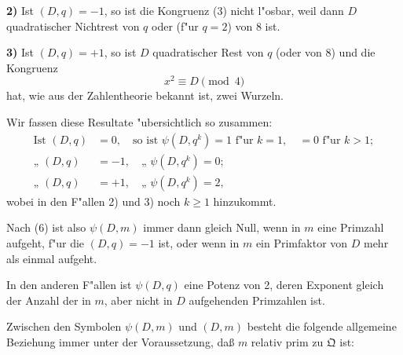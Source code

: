 \documentclass[12pt,a4paper]{article}
\theoremstyle{plain}
\begin{document}
\textbf{2)} Ist $(D, q) = -1$, so ist die Kongruenz (3) nicht l"osbar, weil dann $D$ quadratischer Nichtrest von $q$ oder (f"ur $q = 2$) von 8 ist.

\textbf{3)} Ist $(D, q) = +1$, so ist $D$ quadratischer Rest von $q$ (oder von 8) und die Kongruenz
\[
x^2 \equiv D \pmod{4}
\]
hat, wie aus der Zahlentheorie bekannt ist, zwei Wurzeln.

Wir fassen diese Resultate "ubersichtlich so zusammen:
\begin{align*}
\text{Ist } (D, q) &= 0,\quad \text{so ist } \psi(D, q^k) = 1 \text{ f"ur } k=1,\quad = 0 \text{ f"ur } k > 1;\\
\text{„ } (D, q) &= -1,\quad \text{„ } \psi(D, q^k) = 0;\\
\text{„ } (D, q) &= +1,\quad \text{„ } \psi(D, q^k) = 2,
\end{align*}
wobei in den F"allen 2) und 3) noch $k \geq 1$ hinzukommt.

Nach (6) ist also $\psi(D, m)$ immer dann gleich Null, wenn in $m$ eine Primzahl aufgeht, f"ur die $(D, q) = -1$ ist, oder wenn in $m$ ein Primfaktor von $D$ mehr als einmal aufgeht.

In den anderen F"allen ist $\psi(D, q)$ eine Potenz von 2, deren Exponent gleich der Anzahl der in $m$, aber nicht in $D$ aufgehenden Primzahlen ist.

Zwischen den Symbolen $\psi(D, m)$ und $(D, m)$ besteht die folgende allgemeine Beziehung immer unter der Voraussetzung, da\ss{} $m$ relativ prim zu $\mathfrak{Q}$ ist:
\end{document}
